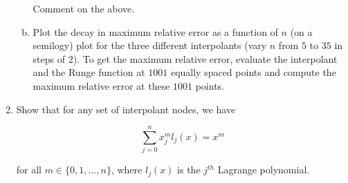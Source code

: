 \documentclass{article}
\begin{document}
\begin{enumerate}
\begin{enumerate}[(a)]
Comment on the above.

\item Plot the decay in maximum relative error as a function of $n$ (on a semilogy) plot for the three different interpolants (vary $n$ from $5$ to $35$ in steps of $2$). To get the maximum relative error, evaluate the interpolant and the Runge function at $1001$ equally spaced points and compute the maximum relative error at these $1001$ points.

\end{enumerate}

\item Show that for any set of interpolant nodes, we have

    $$\displaystyle \sum_{j=0}^{n} x_{j}^{m} l_{j}(x) = x^{m} $$

for all $m \in \{0,1,...,n\}$, where $l_{j}(x)$ is the $j^{th}$ Lagrange polynomial.
\end{enumerate}
\end{document}
